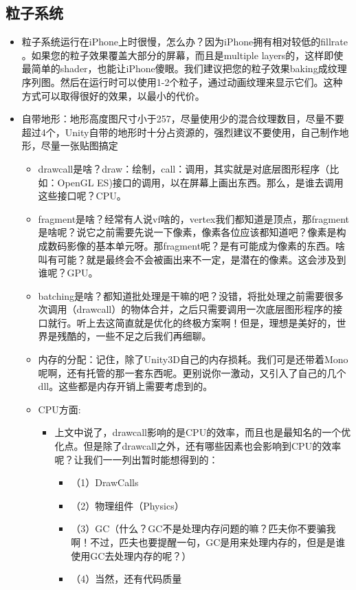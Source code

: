 \documentclass[9pt, b5paper]{article}
\begin{document}
\subsection{粒子系统}
\label{sec:orgffdf3e6}
\begin{itemize}
\item 粒子系统运行在iPhone上时很慢，怎么办？因为iPhone拥有相对较低的fillrate 。如果您的粒子效果覆盖大部分的屏幕，而且是multiple layers的，这样即使最简单的shader，也能让iPhone傻眼。我们建议把您的粒子效果baking成纹理序列图。然后在运行时可以使用1-2个粒子，通过动画纹理来显示它们。这种方式可以取得很好的效果，以最小的代价。
\item 自带地形：地形高度图尺寸小于257，尽量使用少的混合纹理数目，尽量不要超过4个，Unity自带的地形时十分占资源的，强烈建议不要使用，自己制作地形，尽量一张贴图搞定
\begin{itemize}
\item drawcall是啥？draw：绘制，call：调用，其实就是对底层图形程序（比如：OpenGL ES)接口的调用，以在屏幕上画出东西。那么，是谁去调用这些接口呢？CPU。
\item fragment是啥？经常有人说vf啥的，vertex我们都知道是顶点，那fragment是啥呢？说它之前需要先说一下像素，像素各位应该都知道吧？像素是构成数码影像的基本单元呀。那fragment呢？是有可能成为像素的东西。啥叫有可能？就是最终会不会被画出来不一定，是潜在的像素。这会涉及到谁呢？GPU。
\item batching是啥？都知道批处理是干嘛的吧？没错，将批处理之前需要很多次调用（drawcall）的物体合并，之后只需要调用一次底层图形程序的接口就行。听上去这简直就是优化的终极方案啊！但是，理想是美好的，世界是残酷的，一些不足之后我们再细聊。
\item 内存的分配：记住，除了Unity3D自己的内存损耗。我们可是还带着Mono呢啊，还有托管的那一套东西呢。更别说你一激动，又引入了自己的几个dll。这些都是内存开销上需要考虑到的。
\item CPU方面: 
\begin{itemize}
\item 上文中说了，drawcall影响的是CPU的效率，而且也是最知名的一个优化点。但是除了drawcall之外，还有哪些因素也会影响到CPU的效率呢？让我们一一列出暂时能想得到的：
\begin{itemize}
\item （1）DrawCalls
\item （2）物理组件（Physics）
\item （3）GC（什么？GC不是处理内存问题的嘛？匹夫你不要骗我啊！不过，匹夫也要提醒一句，GC是用来处理内存的，但是是谁使用GC去处理内存的呢？）
\item （4）当然，还有代码质量
\end{itemize}
\end{itemize}
\end{itemize}
\end{itemize}
\end{document}

